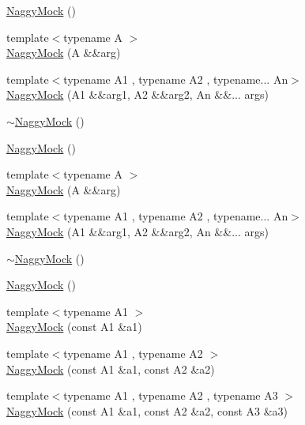 \begin{DoxyCompactItemize}
\item 
\mbox{\hyperlink{classtesting_1_1_naggy_mock_acb769f78b93eb60b04db21250f416f70}{Naggy\+Mock}} ()
\item 
{\footnotesize template$<$typename A $>$ }\\\mbox{\hyperlink{classtesting_1_1_naggy_mock_aab67cd9f71451f89e5fc8938815119ea}{Naggy\+Mock}} (A \&\&arg)
\item 
{\footnotesize template$<$typename A1 , typename A2 , typename... An$>$ }\\\mbox{\hyperlink{classtesting_1_1_naggy_mock_a0169b9eb645d153991fa975c65074179}{Naggy\+Mock}} (A1 \&\&arg1, A2 \&\&arg2, An \&\&... args)
\item 
\mbox{\hyperlink{classtesting_1_1_naggy_mock_a9d00e4811942489b4c3cdd8e8c658518}{$\sim$\+Naggy\+Mock}} ()
\item 
\mbox{\hyperlink{classtesting_1_1_naggy_mock_acb769f78b93eb60b04db21250f416f70}{Naggy\+Mock}} ()
\item 
{\footnotesize template$<$typename A $>$ }\\\mbox{\hyperlink{classtesting_1_1_naggy_mock_aab67cd9f71451f89e5fc8938815119ea}{Naggy\+Mock}} (A \&\&arg)
\item 
{\footnotesize template$<$typename A1 , typename A2 , typename... An$>$ }\\\mbox{\hyperlink{classtesting_1_1_naggy_mock_a0169b9eb645d153991fa975c65074179}{Naggy\+Mock}} (A1 \&\&arg1, A2 \&\&arg2, An \&\&... args)
\item 
\mbox{\hyperlink{classtesting_1_1_naggy_mock_a9d00e4811942489b4c3cdd8e8c658518}{$\sim$\+Naggy\+Mock}} ()
\item 
\mbox{\hyperlink{classtesting_1_1_naggy_mock_acb769f78b93eb60b04db21250f416f70}{Naggy\+Mock}} ()
\item 
{\footnotesize template$<$typename A1 $>$ }\\\mbox{\hyperlink{classtesting_1_1_naggy_mock_ae43ea6c6a6b66fe31cb14f93e0be5718}{Naggy\+Mock}} (const A1 \&a1)
\item 
{\footnotesize template$<$typename A1 , typename A2 $>$ }\\\mbox{\hyperlink{classtesting_1_1_naggy_mock_a4241363ab2ca3a2e7baa5ead980175e6}{Naggy\+Mock}} (const A1 \&a1, const A2 \&a2)
\item 
{\footnotesize template$<$typename A1 , typename A2 , typename A3 $>$ }\\\mbox{\hyperlink{classtesting_1_1_naggy_mock_abd9eea0573bf39f4b41504b2d1df5311}{Naggy\+Mock}} (const A1 \&a1, const A2 \&a2, const A3 \&a3)

\end{DoxyCompactItemize}
